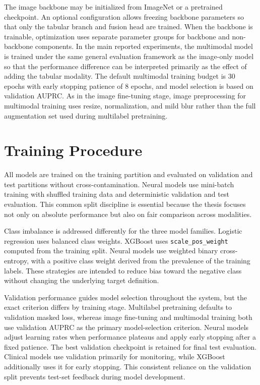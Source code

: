The image backbone may be initialized from ImageNet or a pretrained checkpoint. An optional configuration allows freezing backbone parameters so that only the tabular branch and fusion head are trained. When the backbone is trainable, optimization uses separate parameter groups for backbone and non-backbone components. In the main reported experiments, the multimodal model is trained under the same general evaluation framework as the image-only model so that the performance difference can be interpreted primarily as the effect of adding the tabular modality. The default multimodal training budget is 30 epochs with early stopping patience of 8 epochs, and model selection is based on validation AUPRC. As in the image fine-tuning stage, image preprocessing for multimodal training uses resize, normalization, and mild blur rather than the full augmentation set used during multilabel pretraining.

\section{Training Procedure}

All models are trained on the training partition and evaluated on validation and test partitions without cross-contamination. Neural models use mini-batch training with shuffled training data and deterministic validation and test evaluation. This common split discipline is essential because the thesis focuses not only on absolute performance but also on fair comparison across modalities.

Class imbalance is addressed differently for the three model families. Logistic regression uses balanced class weights. XGBoost uses \texttt{scale\_pos\_weight} computed from the training split. Neural models use weighted binary cross-entropy, with a positive class weight derived from the prevalence of the training labels. These strategies are intended to reduce bias toward the negative class without changing the underlying target definition.

Validation performance guides model selection throughout the system, but the exact criterion differs by training stage. Multilabel pretraining defaults to validation masked loss, whereas image fine-tuning and multimodal training both use validation AUPRC as the primary model-selection criterion. Neural models adjust learning rates when performance plateaus and apply early stopping after a fixed patience. The best validation checkpoint is retained for final test evaluation. Clinical models use validation primarily for monitoring, while XGBoost additionally uses it for early stopping. This consistent reliance on the validation split prevents test-set feedback during model development.

